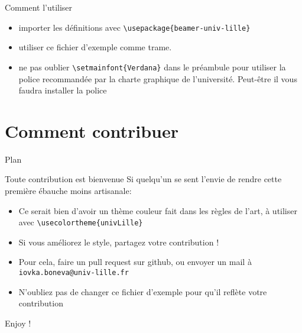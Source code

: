 \documentclass[10pt,aspectratio=169]{beamer}
\newcommand{\TOCcs}{
\begin{frame}{Plan}
\tableofcontents[currentsection]
\end{frame}}
\begin{document}
\begin{frame}{Comment l'utiliser}
  \begin{itemize}
  \item importer les définitions avec \texttt{\textbackslash{}usepackage\{beamer-univ-lille\}} %
  \item utiliser ce fichier d'exemple comme trame.
  \item ne pas oublier \texttt{\textbackslash{}setmainfont\{Verdana\}} dans le préambule pour utiliser la police recommandée par la charte graphique de l'université. Peut-être il vous faudra installer la police
  \end{itemize}
\end{frame}

\section{Comment contribuer}
\TOCcs

\begin{frame}{Toute contribution est bienvenue}
  Si quelqu'un se sent l'envie de rendre cette première ébauche moins artisanale:
  \begin{itemize}
  \item Ce serait bien d'avoir un \alert{thème couleur} fait dans les règles de l'art, à utiliser avec \texttt{\textbackslash{}usecolortheme\{univLille\}}
  \item Si vous améliorez le style, partagez votre contribution !
  \item Pour cela, faire un pull request sur github, ou envoyer un mail à \texttt{iovka.boneva@univ-lille.fr}
  \item N'oubliez pas de changer ce fichier d'exemple pour qu'il reflète votre contribution
  \end{itemize}
\end{frame}


{
  \titlepagestyle
  \begin{frame}{}
    \begin{center}
      Enjoy !
    \end{center}
  \end{frame}
}
\end{document}
